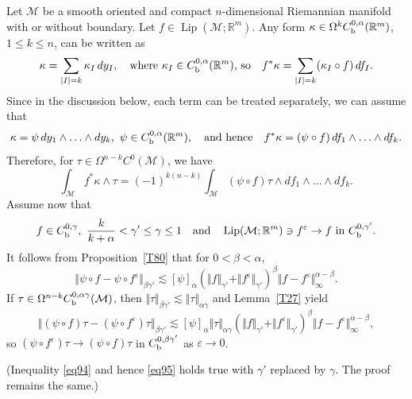 \documentclass[intlimits,12pt,reqno]{amsart}
\newcommand{\cM}{\mathcal M}
\newcommand{\R}{\mathbb R}
\newcommand{\eps}{\varepsilon}
\numberwithin{equation}{section}
\def\lip{\operatorname{Lip}}
\theoremstyle{definition}
\begin{document}
Let $\cM$ be a smooth oriented and compact $n$-dimensional Riemannian manifold with or without boundary. Let $f\in\lip(\cM;\R^m)$.
Any form $\kappa\in\Omega^k C_{\rm b}^{0,\alpha}(\R^m)$, $1\leq k\leq n$, can be written as
$$
\kappa=\sum_{|I|=k}\kappa_I\, dy_I , 
\quad 
\text{where  $\kappa_I\in C_{\rm b}^{0,\alpha}(\R^m)$, so}
\quad
f^*\kappa=\sum_{|I|=k}(\kappa_I\circ f)\, df_I. 
$$
Since in the discussion below, each term can be treated separately, we can assume that
$$
\kappa=\psi\, dy_1\wedge\ldots\wedge dy_k, \ \psi\in C_{\rm b}^{0,\alpha}(\R^m),
\quad
\text{and hence}
\quad
f^*\kappa=(\psi\circ f)\, df_1\wedge\ldots\wedge df_k.
$$
Therefore, for $\tau\in \Omega^{n-k}C^0(\cM)$, we have
$$
\int_{\cM} f^*\kappa\wedge\tau=
(-1)^{k(n-k)}\int_{\cM} (\psi\circ f)\tau\wedge df_1\wedge\ldots \wedge df_k.
$$
Assume now that
$$
f\in C_{\rm b}^{0,\gamma},\ \frac{k}{k+\alpha}<\gamma'\leq\gamma\leq 1
\quad
\text{and}
\quad
\lip({\cM};\R^m)\ni f^\eps\to f \ \text{in $C_{\rm b}^{0,\gamma'}$.}
$$
It follows from Proposition~\ref{T80} that for $0<\beta<\alpha$,
\begin{equation}
\label{eq94}
\Vert \psi\circ f-\psi\circ f^\eps\Vert_{\beta\gamma'}\lesssim
[\psi]_{\alpha}(\Vert f\Vert_{\gamma'}+\Vert f^\eps\Vert_{\gamma'})^{\beta}
\Vert f-f^\eps\Vert_\infty^{\alpha-\beta}.
\end{equation}
If $\tau\in \Omega^{n-k}C_{\rm b}^{0,\alpha\gamma}(\cM)$, then $\Vert\tau\Vert_{\beta\gamma'}\lesssim\Vert\tau\Vert_{\alpha\gamma}$ and Lemma~\ref{T27} yield
\begin{equation}
\label{eq95}
\Vert (\psi\circ f)\tau-(\psi\circ f^\eps)\tau\Vert_{\beta\gamma'}\lesssim
[\psi]_{\alpha}\Vert\tau\Vert_{\alpha\gamma}(\Vert f\Vert_{\gamma'}+\Vert f^\eps\Vert_{\gamma'})^{\beta}
\Vert f-f^\eps\Vert_\infty^{\alpha-\beta},
\end{equation}
so $(\psi\circ f^\eps)\tau\to(\psi\circ f)\tau$ in $C_{\rm b}^{0,\beta\gamma'}$ as $\eps\to 0$.

(Inequality \eqref{eq94} and hence \eqref{eq95} holds true with $\gamma'$ replaced by $\gamma$. The proof remains the same.)
\end{document}
